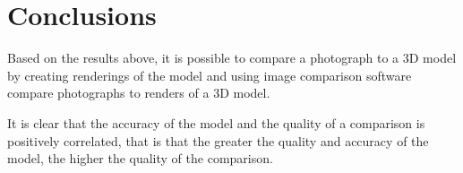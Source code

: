 \documentclass[11pt,a4paper]{report}
\begin{document}
	\section{Conclusions}
		Based on the results above, it is possible to compare a photograph to a 3D model by creating renderings of the model and using image comparison software compare photographs to renders of a 3D model.
		
		It is clear that the accuracy of the model and the quality of a comparison is positively correlated, that is that the greater the quality and accuracy of the model, the higher the quality of the comparison.
		
\newpage
\printbibliography[title={References}]
\end{document}
